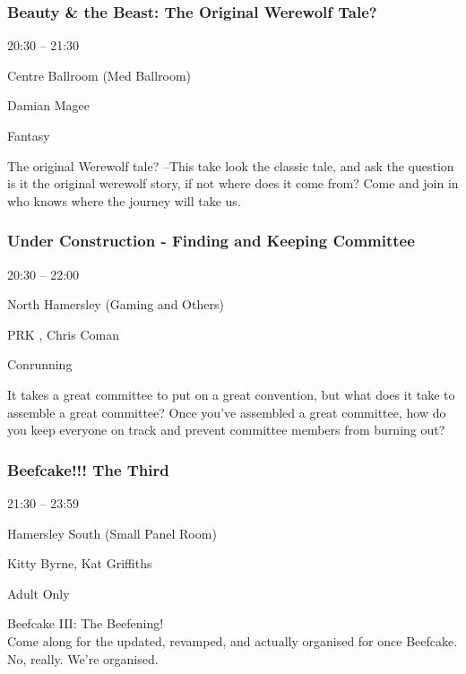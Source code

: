 \documentclass{scrreprt}
\begin{document}
\begin{multicols}{2}
\subsubsection*{Beauty \& the Beast: The Original Werewolf Tale?}\begin{description}
\setlength{\itemsep}{0pt}
\setlength{\parsep}{0pt}
\setlength{\parskip}{0pt}
\item[Time:]{20:30 -- 21:30}
\item[Venue:]{Centre Ballroom (Med Ballroom)}
\item[People:]{Damian Magee}
\item[Tags:]{Fantasy}\end{description}
The original Werewolf tale? –This take look the classic tale, and ask the question is it the original werewolf story, if not where does it come from?  Come and join in who knows where the journey will take us.
\subsubsection*{Under Construction - Finding and Keeping Committee}\begin{description}
\setlength{\itemsep}{0pt}
\setlength{\parsep}{0pt}
\setlength{\parskip}{0pt}
\item[Time:]{20:30 -- 22:00}
\item[Venue:]{North Hamersley (Gaming and Others)}
\item[People:]{PRK , Chris Coman}
\item[Tags:]{Conrunning}\end{description}
It takes a great committee to put on a great convention, but what does it take to assemble a great committee? Once you've assembled a great committee, how do you keep everyone on track and prevent committee members from burning out?
\subsubsection*{Beefcake!!! The Third}\begin{description}
\setlength{\itemsep}{0pt}
\setlength{\parsep}{0pt}
\setlength{\parskip}{0pt}
\item[Time:]{21:30 -- 23:59}
\item[Venue:]{Hamersley South (Small Panel Room)}
\item[People:]{Kitty Byrne, Kat Griffiths}
\item[Tags:]{Adult Only}\end{description}
Beefcake III: The Beefening!\\Come along for the updated, revamped, and actually organised for once Beefcake. No, really. We're organised.

\end{multicols}
\end{document}
